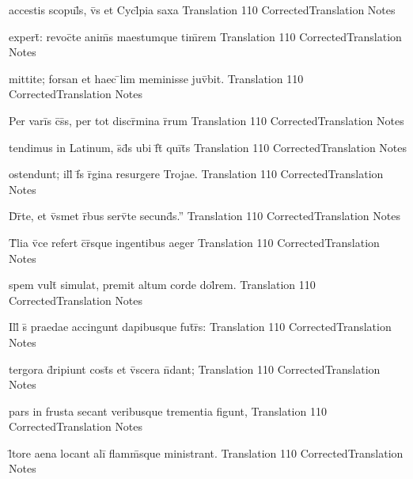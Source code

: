 \documentclass[]{book}
\begin{document}
\latline
  {accestis scopul\={}s, v\={}s et Cycl\={}pia saxa }
  { Translation }
  {110}
  { CorrectedTranslation }
  { Notes }


\latline
  {expert\={\macron {\i}}:  revoc\={}te anim\={}s maestumque tim\={}rem}
  { Translation }
  {110}
  { CorrectedTranslation }
  { Notes }


\latline
  {mittite; forsan et haec \={}lim meminisse juv\={}bit.}
  { Translation }
  {110}
  { CorrectedTranslation }
  { Notes }


\latline
  {Per vari\={}s c\={}s\={}s, per tot discr\={\macron {\i}}mina r\={}rum}
  { Translation }
  {110}
  { CorrectedTranslation }
  { Notes }


\latline
  {tendimus in Latinum, s\={}d\={}s ubi f\={}t\={} qui\={}t\={}s}
  { Translation }
  {110}
  { CorrectedTranslation }
  { Notes }


\latline
  {ostendunt; ill\={\macron {\i}} f\={}s r\={}gina resurgere Trojae.}
  { Translation }
  {110}
  { CorrectedTranslation }
  { Notes }


\latline
  {D\={}r\={}te, et v\={}smet r\={}bus serv\={}te secund\={\macron {\i}}s.''}
  { Translation }
  {110}
  { CorrectedTranslation }
  { Notes }


\latline
  {T\={}lia v\={}ce refert c\={}r\={\macron {\i}}sque ingentibus aeger}
  { Translation }
  {110}
  { CorrectedTranslation }
  { Notes }


\latline
  {spem vult\={} simulat, premit altum corde dol\={}rem.}
  { Translation }
  {110}
  { CorrectedTranslation }
  { Notes }


\latline
  {Ill\={\macron {\i}} s\={} praedae accingunt dapibusque fut\={}r\={\macron {\i}}s:}
  { Translation }
  {110}
  { CorrectedTranslation }
  { Notes }


\latline
  {tergora d\={\macron {\i}}ripiunt cost\={\macron {\i}}s et v\={\macron {\i}}scera n\={}dant;}
  { Translation }
  {110}
  { CorrectedTranslation }
  { Notes }


\latline
  {pars in frusta secant veribusque trementia figunt,}
  { Translation }
  {110}
  { CorrectedTranslation }
  { Notes }


\latline
  {l\={\macron {\i}}tore aena locant ali\={\macron {\i}} flamm\={}sque ministrant.}
  { Translation }
  {110}
  { CorrectedTranslation }
  { Notes }
\end{document}
